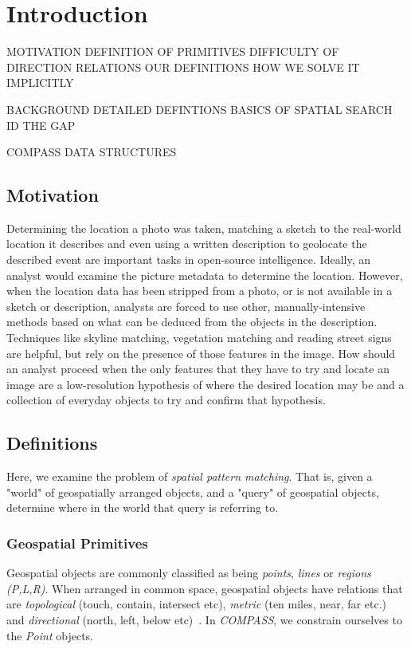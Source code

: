 \section{Introduction}

MOTIVATION
DEFINITION OF PRIMITIVES
DIFFICULTY OF DIRECTION RELATIONS
OUR DEFINITIONS
HOW WE SOLVE IT IMPLICITLY

BACKGROUND
    DETAILED DEFINTIONS
    BASICS OF SPATIAL SEARCH
    ID THE GAP

COMPASS DATA STRUCTURES




\label{section:introduction}

\subsection{Motivation}
\par{
    Determining the location a photo was taken, matching a sketch to the real-world location it describes and even using a written description to geolocate the described event are important tasks in open-source intelligence. 
    Ideally, an analyst would examine the picture metadata to determine the location.
    However, when the location data has been stripped from a photo, or is not available in a sketch or description, analysts are forced to use other, manually-intensive methods based on what can be deduced from the objects in the description.
    Techniques like skyline matching, vegetation matching and reading street signs are helpful, but rely on the presence of those features in the image. 
    How should an analyst proceed when the only features that they have to try and locate an image are a low-resolution hypothesis of where the desired location may be and a collection of everyday objects to try and confirm that hypothesis.
}

\subsection{Definitions}
\par{
    Here, we examine the problem of \textit{spatial pattern matching}. That is, given a "world" of geospatially arranged objects, and a "query" of geospatial objects, determine where in the world that query is referring to.
}

\subsubsection{Geospatial Primitives}
\par{
    Geospatial objects are commonly classified as being \textit{points}, \textit{lines} or \textit{regions} \textit{(P,L,R)}. 
    When arranged in common space, geospatial objects have relations that are  \textit{topological} (touch, contain, intersect etc), \textit{metric} (ten miles, near, far etc.) and \textit{directional} (north, left, below etc)~\cite{Carniel2020,Bertella2022,Carniel2023}.
    In \emph{COMPASS}, we constrain ourselves to the \textit{Point} objects.
    }

